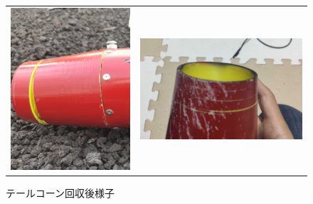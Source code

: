 \documentclass[a4paper,11pt,titlepage,uplatex]{jsarticle}
\begin{document}
\begin{itemize}
    \begin{figure}[H]
        \begin{tabular}{cc}
        \begin{minipage}[t]{0.45\hsize}
        \centering
        \includegraphics[scale = 0.1]{pic_str/s_tale_after2.jpg}
        \caption{テールコーン回収時様子}\label{s_tale_after1}
        \end{minipage}&
        \begin{minipage}[t]{0.45\hsize}
        \centering
        \includegraphics[scale = 0.1]{pic_str/s_tale_after1.jpg}
        \caption{テールコーン回収後様子}\label{s_tale_after2}
        \end{minipage}\end{tabular}
    \end{figure}
\end{itemize}
\end{document}
